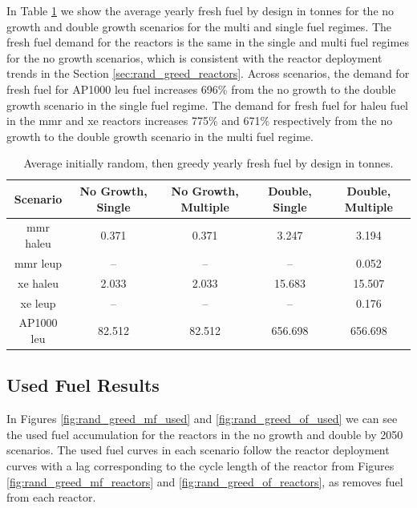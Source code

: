 In Table \ref{tab:rand_greed_fresh_avg} we show the average yearly fresh fuel by design in tonnes for the no growth and double growth scenarios for the multi and single fuel regimes. The fresh fuel demand for the reactors is the same in the single and multi fuel regimes for the no growth scenarios, which is consistent with the reactor deployment trends in the Section \ref{sec:rand_greed_reactors}. Across scenarios, the demand for fresh fuel for AP1000 \gls{leu} fuel increases 696\% from the no growth to the double growth scenario in the single fuel regime. The demand for fresh fuel for \gls{haleu} fuel in the \gls{mmr} and \gls{xe} reactors increases 775\% and 671\% respectively from the no growth to the double growth scenario in the multi fuel regime.

\begin{table}[H]
    \centering
    \caption{Average initially random, then greedy yearly fresh fuel by design in tonnes.}
    \label{tab:rand_greed_fresh_avg}
    \begin{tabular}{c c c c c}
       \hline
       Scenario & No Growth, Single & No Growth, Multiple & Double, Single & Double, Multiple  \\
       \hline
       \gls{mmr} \gls{haleu}   & 0.371    & 0.371   & 3.247    & 3.194    \\
       \gls{mmr} \gls{leup}    & --       & --      & --       & 0.052    \\
       \gls{xe} \gls{haleu}    & 2.033    & 2.033   & 15.683   & 15.507   \\
       \gls{xe} \gls{leup}     & --       & --      & --       & 0.176    \\
       AP1000 \gls{leu}        & 82.512   & 82.512  & 656.698  & 656.698  \\
       \hline
    \end{tabular}
\end{table}


\subsection{Used Fuel Results}
\label{sec:rand_greed_used}

In Figures \ref{fig:rand_greed_mf_used} and \ref{fig:rand_greed_of_used} we can see the used fuel accumulation for the reactors in the no growth and double by 2050 scenarios. The used fuel curves in each scenario follow the reactor deployment curves with a lag corresponding to the cycle length of the reactor from Figures \ref{fig:rand_greed_mf_reactors} and \ref{fig:rand_greed_of_reactors}, as \cyclus removes fuel from each reactor.


